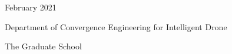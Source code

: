 \documentclass[
11pt, %
english, %
doublespacing, %
liststotoc, %
headsepline, %
]{MastersDoctoralThesis} %
\author{Your Name} %
\begin{document}
	
	\frontmatter %
	
	\pagestyle{plain} %
	

\begin{titlepage}
	\begin{center}
		
		\vspace*{.01\textheight}
		
		{\bfseries \fontsize{21}{20}\selectfont \ttitle\par}\vspace{3cm} 
		
		{\fontsize{16}{12}\selectfont \authorname\par}\vspace{2.5cm} 
		
		{\fontsize{14}{12}\selectfont February 2021\par}\vspace{2.5cm} 
		
		{\fontsize{16}{12}\selectfont  \deptname\par}\vspace{0.4cm}
		{\fontsize{16}{12}\selectfont  Department of Convergence Engineering for Intelligent Drone\par}\vspace{0.4cm}
		{\fontsize{16}{12}\selectfont  The Graduate School\par}\vspace{0.4cm} 
		{\fontsize{16}{12}\selectfont  \univname \par}
		
		\vfill
	\end{center}
\end{titlepage}


\end{document}

